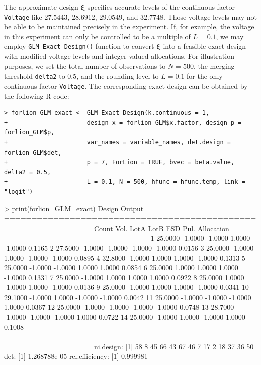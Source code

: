 \noindent
The approximate design $\boldsymbol{\xi}$ specifies accurate levels of the continuous factor \texttt{Voltage} like $27.5443$, $28.6912$, $29.0549$, and $32.7748$. Those voltage levels may not be able to be maintained precisely in the experiment.  If, for example, the voltage in this experiment can only be controlled to be a multiple of $L=0.1$, we may employ \verb|GLM_Exact_Design()| function to convert $\boldsymbol{\xi}$ into a feasible exact design with modified voltage levels and integer-valued allocations.
For illustration purposes, we set the total number of observations to $N = 500$, the merging threshold \verb|delta2| to $0.5$, and the rounding level to $L = 0.1$ for the only continuous factor \texttt{Voltage}. The corresponding exact design can be obtained by the following R code:  
\begin{Verbatim}
> forlion_GLM_exact <- GLM_Exact_Design(k.continuous = 1, 
+                      design_x = forlion_GLM$x.factor, design_p = forlion_GLM$p, 
+                      var_names = variable_names, det.design = forlion_GLM$det, 
+                      p = 7, ForLion = TRUE, bvec = beta.value, delta2 = 0.5, 
+                      L = 0.1, N = 500, hfunc = hfunc.temp, link = "logit")
\end{Verbatim}
\begin{example}
> print(forlion_GLM_exact)
Design Output
============================================================== 
Count  Vol.     LotA     LotB     ESD      Pul.     Allocation
-------------------------------------------------------------- 
1      25.0000  -1.0000  -1.0000   1.0000  -1.0000  0.1165
2      27.5000  -1.0000  -1.0000  -1.0000  -1.0000  0.0156
3      25.0000  -1.0000   1.0000  -1.0000  -1.0000  0.0895
4      32.8000  -1.0000   1.0000   1.0000  -1.0000  0.1313
5      25.0000  -1.0000  -1.0000   1.0000   1.0000  0.0854
6      25.0000   1.0000   1.0000   1.0000  -1.0000  0.1331
7      25.0000  -1.0000   1.0000   1.0000   1.0000  0.0922
8      25.0000   1.0000  -1.0000   1.0000  -1.0000  0.0136
9      25.0000  -1.0000   1.0000   1.0000  -1.0000  0.0341
10     29.1000  -1.0000   1.0000  -1.0000  -1.0000  0.0042
11     25.0000  -1.0000  -1.0000  -1.0000   1.0000  0.0367
12     25.0000  -1.0000  -1.0000  -1.0000  -1.0000  0.0748
13     28.7000  -1.0000  -1.0000  -1.0000   1.0000  0.0722
14     25.0000  -1.0000   1.0000  -1.0000   1.0000  0.1008
============================================================== 
ni.design:
[1] 58  8 45 66 43 67 46  7 17  2 18 37 36 50
det:
[1] 1.268788e-05
rel.efficiency:
[1] 0.999981
\end{example}

